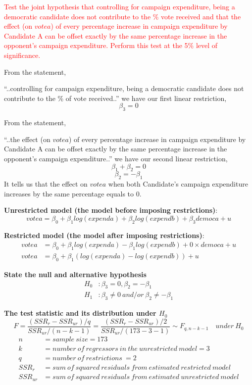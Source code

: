 \documentclass[12pt]{report}
\begin{document}
\noindent \textcolor{red}
{
	Test the joint hypothesis that controlling for campaign expenditure, being a democratic candidate does not contribute to the \% vote received and that the effect (on $votea$) of every percentage increase in campaign expenditure by Candidate A can be offset exactly by the same percentage increase in the opponent’s campaign expenditure. Perform this test at the 5\% level of significance.
}

\noindent From the statement,

\centering
“..controlling for campaign expenditure, being a democratic candidate does not contribute to the \% of vote received..”
\vspace{-\baselineskip}
\justify
we have our first linear restriction,
$$\beta_3 = 0$$

\noindent From the statement,

\centering
“..the effect (on $votea$) of every percentage increase in campaign expenditure by Candidate A can be offset exactly by the same percentage increase in the opponent’s campaign expenditure..”
\vspace{-\baselineskip}
\justify
we have our second linear restriction,
$$\beta_1 + \beta_2 = 0$$
$$\beta_2 = -\beta_1$$
\noindent It tells us that the effect on $votea$ when both Candidate's campaign expenditure increases by the same percentage equals to 0.
\vspace{10mm}

\noindent \textbf{Unrestricted model (the model before imposing restrictions)}:
$$votea = \beta_0 + \beta_1log(expenda) + \beta_2log(expendb) + \beta_3democa + u$$

\noindent \textbf{Restricted model (the model after imposing restrictions)}:
\begin{align*}
	votea &= \beta_0 + \beta_1log(expenda) - \beta_1log(expendb) + 0{\times}democa + u \\
	votea &= \beta_0 + \beta_1(log(expenda) - log(expendb)) + u
\end{align*}

\newpage
\noindent \textbf{State the null and alternative hypothesis}
\begin{align*}
	H_0&: \beta_3 = 0, \beta_2 = -\beta_1 \\
	H_1&: \beta_3 \neq 0\ and/or\ \beta_2 \neq -\beta_1
\end{align*}

\noindent \textbf{The test statistic and its distribution under $H_0$}
$$F = \dfrac{(SSR_r - SSR_{ur})/q}{SSR_{ur}/(n-k-1)} = \dfrac{(SSR_r - SSR_{ur})/2}{SSR_{ur}/(173-3-1)} \sim F_{q,n-k-1} \quad under\ H_0$$
\begin{align*}
n &= sample\ size = 173 \\
k &= number\ of\ regressors\ in\ the\ unrestricted\ model = 3 \\
q &= number\ of\ restrictions\ = 2 \\
SSR_{r} &= sum\ of\ squared\ residuals\ from\ estimated\ restricted\ model \\
SSR_{ur} &= sum\ of\ squared\ residuals\ from\ estimated\ unrestricted\ model
\end{align*}
\end{document}
